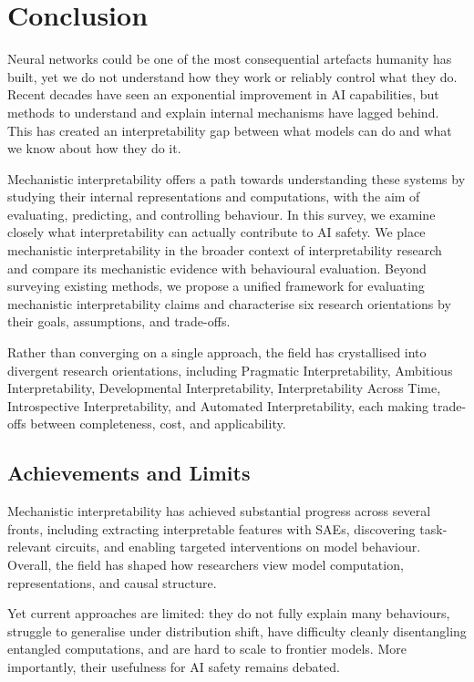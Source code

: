 \section{Conclusion}
\label{sec:conclusion}

Neural networks could be one of the most consequential artefacts humanity has built, yet we do not understand how they work or reliably control what they do. Recent decades have seen an exponential improvement in AI capabilities, but methods to understand and explain internal mechanisms have lagged behind. This has created an interpretability gap between what models can do and what we know about how they do it.

Mechanistic interpretability offers a path towards understanding these systems by studying their internal representations and computations, with the aim of evaluating, predicting, and controlling behaviour. In this survey, we examine closely what interpretability can actually contribute to AI safety. We place mechanistic interpretability in the broader context of interpretability research and compare its mechanistic evidence with behavioural evaluation. Beyond surveying existing methods, we propose a unified framework for evaluating mechanistic interpretability claims and characterise six research orientations by their goals, assumptions, and trade-offs.

Rather than converging on a single approach, the field has crystallised into divergent research orientations, including Pragmatic Interpretability, Ambitious Interpretability, Developmental Interpretability, Interpretability Across Time, Introspective Interpretability, and Automated Interpretability, each making trade-offs between completeness, cost, and applicability.

\subsection{Achievements and Limits}

Mechanistic interpretability has achieved substantial progress across several fronts, including extracting interpretable features with SAEs, discovering task-relevant circuits, and enabling targeted interventions on model behaviour. Overall, the field has shaped how researchers view model computation, representations, and causal structure.

Yet current approaches are limited: they do not fully explain many behaviours, struggle to generalise under distribution shift, have difficulty cleanly disentangling entangled computations, and are hard to scale to frontier models. More importantly, their usefulness for AI safety remains debated.


